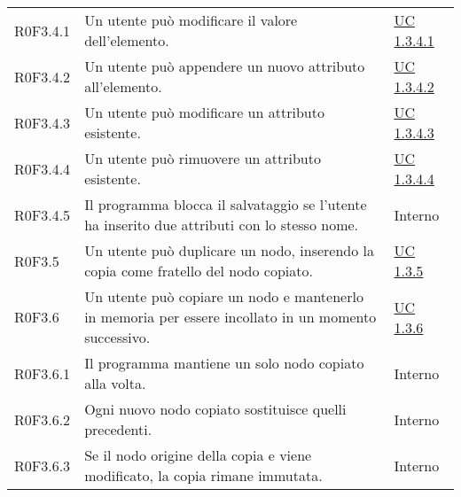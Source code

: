 \begin{center}
\begin{longtable}{p{4.2cm}!{\color{white}\vrule width 0.5mm}p{6cm}!{\color{white}\vrule width 0.5mm}p{2.5cm}!{\color{white}\vrule width 0.5mm}}
				\hspace{4mm}\hypertarget{XER0F3.4.1}{R0F3.4.1} & Un utente può modificare il valore dell'elemento. & \hyperref[subsec:XEUC1.3.4.1]{UC 1.3.4.1}\\
	
				\hspace{4mm}\hypertarget{XER0F3.4.2}{R0F3.4.2} & Un utente può appendere un nuovo attributo all'elemento. & \hyperref[subsec:XEUC1.3.4.2]{UC 1.3.4.2}\\
	
				\hspace{4mm}\hypertarget{XER0F3.4.3}{R0F3.4.3} & Un utente può modificare un attributo esistente. & \hyperref[subsec:XEUC1.3.4.3]{UC 1.3.4.3}\\
	
				\hspace{4mm}\hypertarget{XER0F3.4.4}{R0F3.4.4} & Un utente può rimuovere un attributo esistente. & \hyperref[subsec:XEUC1.3.4.4]{UC 1.3.4.4}\\
	
				\hspace{4mm}\hypertarget{XER0F3.4.5}{R0F3.4.5} & Il programma blocca il salvataggio se l'utente ha inserito due attributi con lo stesso nome. & Interno\\
	
			\hspace{2mm}\hypertarget{XER0F3.5}{R0F3.5} & Un utente può duplicare un nodo, inserendo la copia come fratello del nodo copiato. & \hyperref[subsec:XEUC1.3.5]{UC 1.3.5}\\
	
			\hspace{2mm}\hypertarget{XER0F3.6}{R0F3.6} & Un utente può copiare un nodo e mantenerlo in memoria per essere incollato in un momento successivo. & \hyperref[subsec:XEUC1.3.6]{UC 1.3.6}\\
				
				\hspace{4mm}\hypertarget{XER0F3.6.1}{R0F3.6.1} & Il programma mantiene un solo nodo copiato alla volta. & Interno\\
	
				\hspace{4mm}\hypertarget{XER0F3.6.2}{R0F3.6.2} & Ogni nuovo nodo copiato sostituisce quelli precedenti. & Interno\\
	
				\hspace{4mm}\hypertarget{XER0F3.6.3}{R0F3.6.3} & Se il nodo origine della copia e viene modificato, la copia rimane immutata. & Interno\\
	

\end{longtable}
\end{center}
